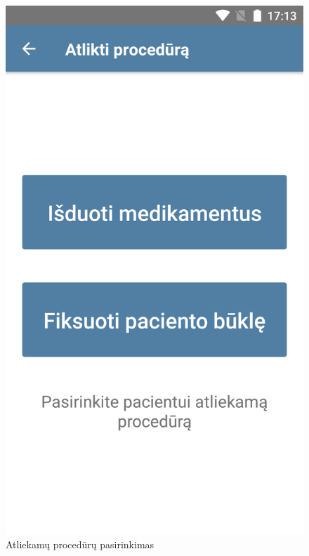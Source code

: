 \documentclass{VUMIFPSbakalaurinis}
\begin{document}
\begin{figure}[H]
    \centering
    \includegraphics[scale=0.15]{images/prototype-5}
    \caption{Atliekamų procedūrų pasirinkimas} 
\end{figure}
\end{document}

